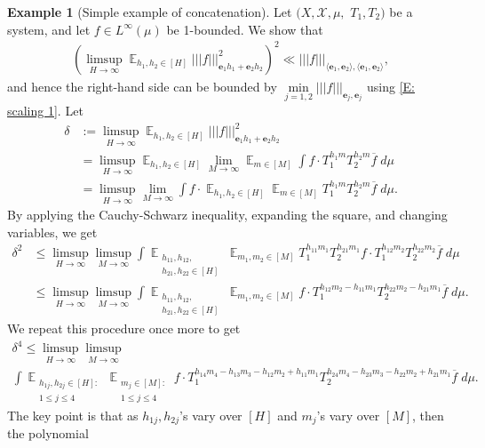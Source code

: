 \documentclass[11pt]{amsart}
\theoremstyle{definition}
\newtheorem{example}[lemma]{Example}
\DeclareMathOperator*{\E}{\mathbb{E}}
\newcommand{\CX}{{\mathcal X}}
\newcommand{\be}{{\mathbf{e}}}
\newcommand{\nnorm}[1]{\lvert\!|\!| #1|\!|\!\rvert}
\newcommand{\1}{{\mathbf{1}}}
\newcommand{\brac}[1]{\mathopen{}\left( #1 \mathclose{}\right)}
\begin{document}
\begin{example}[Simple example of concatenation]
    Let $(X, \CX, \mu,$\! $T_1, T_2)$ be a system, and let $f\in L^\infty(\mu)$ be 1-bounded.
    We show that 
    \begin{align*}
        \brac{\limsup_{H\to\infty}\E_{h_1,h_2\in[H]}\nnorm{f}_{\be_1 h_1 + \be_2 h_2}^2}^2\ll \nnorm{f}_{\langle\be_1,\be_2\rangle,\langle\be_1,\be_2\rangle},
    \end{align*}
    and hence the right-hand side can be bounded by $\min\limits_{j=1,2}\nnorm{f}_{\be_j, \be_j}$ using \eqref{E: scaling 1}.
    Let
    \begin{align*}
        \delta &:= \limsup_{H\to\infty}\E_{h_1,h_2\in[H]}\nnorm{f}_{\be_1 h_1 + \be_2 h_2}^2\\
        &= \limsup_{H\to\infty}\E_{h_1,h_2\in[H]}\lim_{M\to\infty}\E_{m\in[M]}\int f\cdot T_1^{h_1 m}T_2^{h_2 m}\overline{f}\; d\mu\\
        &=\limsup_{H\to\infty}\lim_{M\to\infty}\int f\cdot \E_{h_1,h_2\in[H]}\E_{m\in[M]} T_1^{h_1 m}T_2^{h_2 m}\overline{f}\; d\mu.
    \end{align*}
    By applying the Cauchy-Schwarz inequality, expanding the square, and changing variables, we get
    \begin{align*}
        \delta^2 &\leq \limsup_{H\to\infty}\limsup_{M\to\infty}\int \E_{\substack{h_{11},h_{12},\\ h_{21},h_{22}\in[H]}}\E_{m_1,m_2\in[M]} T_1^{h_{11} m_1}T_2^{h_{21} m_1}{f}\cdot T_1^{h_{12} m_2}T_2^{h_{22} m_2}\overline{f}\; d\mu\\
        &\leq \limsup_{H\to\infty}\limsup_{M\to\infty}\int \E_{\substack{h_{11},h_{12},\\ h_{21},h_{22}\in[H]}}\E_{m_1,m_2\in[M]} {f}\cdot T_1^{h_{12} m_2 -h_{11} m_1}T_2^{h_{22} m_2-h_{21} m_1}\overline{f}\; d\mu.
    \end{align*}
    We repeat this procedure once more to get
    \begin{multline*}
        \delta^4\leq \limsup_{H\to\infty}\limsup_{M\to\infty}\\
        \int \E_{\substack{h_{1j},h_{2j}\in[H]:\\ 1\leq j\leq 4}}\E_{\substack{m_j\in[M]:\\ 1\leq j\leq 4}} {f}\cdot T_1^{h_{14} m_4 -h_{13} m_3- h_{12} m_2 +h_{11} m_1}T_2^{h_{24} m_4 -h_{23} m_3- h_{22} m_2 +h_{21} m_1}\overline{f}\; d\mu.
    \end{multline*}
    The key point is that as $h_{1j}, h_{2j}$'s vary over $[H]$ and $m_j$'s vary over $[M]$, then the polynomial 

\end{example}
\end{document}
